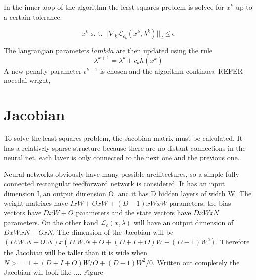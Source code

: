 In the inner loop of the algorithm the least squares problem is solved for $x^k$ up to a certain tolerance.

\begin{equation}
x^k \text{ s. t. } ||\nabla_k\mathcal{L}_{c_k}(x^k,\lambda^k)||_2 \leq \epsilon
\end{equation}

The langrangian parameters $lambda$ are then updated using the rule:
\begin{equation}
\lambda^{k+1} = \lambda^k + c_kh(x^k)
\end{equation}
A new penalty parameter $c^{k+1}$ is chosen and the algorithm continues. REFER nocedal wright, 

\section{Jacobian}
To solve the least squares problem, the Jacobian matrix must be calculated. It has a relatively sparse structure because there are no distant connections in the neural net, each layer is only connected to the next one and the previous one.

Neural networks obviously have many possible architectures, so a simple fully connected rectangular feedforward network is considered. It has an input dimension I, an output dimension O, and it has D hidden layers of width W. The weight matrixes have $IxW + OxW + (D-1)xWxW$ parameters, the bias vectors have $DxW+O$ parameters and the state vectors have $DxWxN$ parameters. On the other hand $\mathcal{L}_c(x,\lambda)$ will have an output dimension of $DxWxN + OxN$. The dimension of the Jacobian will be $(D.W.N + O.N)x(D.W.N + O + (D+I+O)W + (D-1)W^2)$. Therefore the Jacobian will be taller than it is wide when $N >= 1 + (D+I+O)W/O + (D-1)W^2/0$. Written out completely the Jacobian will look like .... Figure 

\newpage

